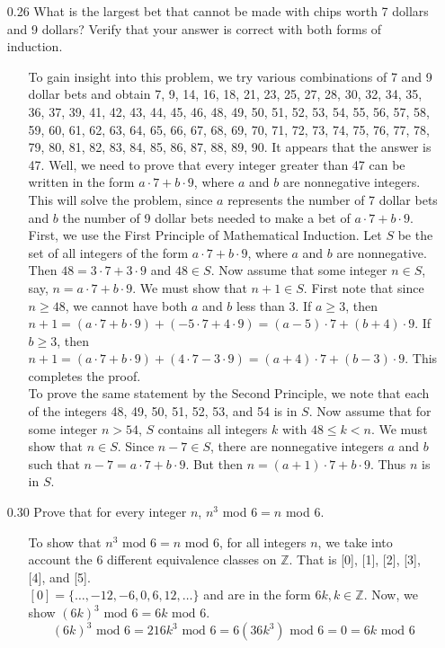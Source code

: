 \documentclass[12pt]{article}
\begin{document}
\begin{enumerate}
\item[0.26] What is the largest bet that cannot be made with chips worth 7 dollars and 9 dollars?
Verify that your answer is correct with both forms of induction.
\begin{enumerate}
\item[] To gain insight into this problem, we try various combinations of 7 and 9 dollar bets and obtain
7, 9, 14, 16, 18, 21, 23, 25, 27, 28, 30, 32, 34, 35, 36, 37, 39, 41, 42, 43, 44, 45, 46, 48, 49, 50, 
51, 52, 53, 54, 55, 56, 57, 58, 59, 60, 61, 62, 63, 64, 65, 66, 67, 68, 69, 70, 71, 72, 73, 74, 75, 76,
77, 78, 79, 80, 81, 82, 83, 84, 85, 86, 87, 88, 89, 90. It appears that the answer is 47. Well, we need
to prove that every integer greater than 47 can be written in the form $a \cdot 7 + b \cdot 9$, where
$a$ and $b$ are nonnegative integers. This will solve the problem, since $a$ represents the number of 
7 dollar bets and $b$ the number of 9 dollar bets needed to make a bet of $a \cdot 7 + b \cdot 9$. \\
First, we use the First Principle of Mathematical Induction. Let $S$ be the set of all integers of
the form $a \cdot 7 + b \cdot 9$, where $a$ and $b$ are nonnegative. Then $48 = 3 \cdot 7 + 3 \cdot 9$ 
and $48 \in S$. Now assume that some integer $n \in S$, say, $n = a \cdot 7 + b \cdot 9$. We must show
that $n + 1 \in S$. First note that since $n \geq 48$, we cannot have both $a$ and $b$ less than 3.
If $a \geq 3$, then $n + 1 = (a \cdot 7 + b \cdot 9) + (-5 \cdot 7 + 4 \cdot 9) = (a - 5) \cdot 7 + 
(b + 4) \cdot 9$. If $b \geq 3$, then $n + 1 = (a \cdot 7 + b \cdot 9) + (4 \cdot 7 - 3 \cdot 9) =
(a + 4) \cdot 7 + (b - 3) \cdot 9$. This completes the proof. \\
To prove the same statement by the Second Principle, we note that each of the integers 
48, 49, 50, 51, 52, 53, and 54 is in $S$. Now assume that for some integer $n > 54$, 
$S$ contains all integers $k$ with $48 \leq k < n$. We must show that $n \in S$. Since
$n - 7 \in S$, there are nonnegative integers $a$ and $b$ such that $n - 7 = a \cdot 7 + 
b \cdot 9$. But then $n = (a + 1) \cdot 7 + b \cdot 9$. Thus $n$ is in $S$.
\end{enumerate}

\item[0.30] Prove that for every integer $n$, $n^3$ mod $6 = n$ mod $6$.
\begin{enumerate}
\item[] To show that $n^3\mbox{ mod } 6 = n\mbox{ mod } 6$, for all integers $n$, 
we take into account the 6 different equivalence classes on $\mathbb{Z}$.
That is [0], [1], [2], [3], [4], and [5]. \\
$[0] = \{\ldots, -12, -6, 0, 6, 12, \ldots\}$ and are in the form $6k, k \in \mathbb{Z}$.
Now, we show $(6k)^3\mbox{ mod } 6 = 6k\mbox{ mod } 6$. 
\[ (6k)^3\mbox{ mod } 6 = 216k^3\mbox{ mod } 6 = 6(36k^3)\mbox{ mod } 6 = 0 = 6k\mbox{ mod } 6 \]


\end{enumerate}
\end{enumerate}
\end{document}

